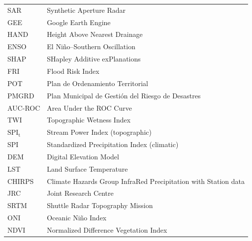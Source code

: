 \documentclass{article}
\begin{document}
\noindent
\begin{tabular}{@{}ll}
SAR & Synthetic Aperture Radar\\
GEE & Google Earth Engine\\
HAND & Height Above Nearest Drainage\\
ENSO & El Ni\~no--Southern Oscillation\\
SHAP & SHapley Additive exPlanations\\
FRI & Flood Risk Index\\
POT & Plan de Ordenamiento Territorial\\
PMGRD & Plan Municipal de Gesti\'on del Riesgo de Desastres\\
AUC-ROC & Area Under the ROC Curve\\
TWI & Topographic Wetness Index\\
$\text{SPI}_{\text{t}}$ & Stream Power Index (topographic)\\
SPI & Standardized Precipitation Index (climatic)\\
DEM & Digital Elevation Model\\
LST & Land Surface Temperature\\
CHIRPS & Climate Hazards Group InfraRed Precipitation with Station data\\
JRC & Joint Research Centre\\
SRTM & Shuttle Radar Topography Mission\\
ONI & Oceanic Ni\~no Index\\
NDVI & Normalized Difference Vegetation Index
\end{tabular}




\end{document}
